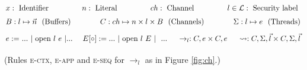 \documentclass[10pt,preprint]{sigplanconf}
\renewcommand{\t}[1]{~\text{#1}~}
\begin{document}



\begin{figure*}
\[ \arraycolsep=1.6pt\def\arraystretch{1.5}
\begin{array}{rl}
  \multicolumn{2}{l}{x : \t{Identifier} \hfill n : \t{Literal} \hfill ch : \t{Channel} \hfill l \in \mathcal{L} : \t{Security label}} \\
  \multicolumn{2}{l}{
    B : l \mapsto \vec{n} ~~(\text{Buffers})~~\hfill~~
    C : ch \mapsto n \times l \times B~~(\text{Channels})~~\hfill~~
    \Sigma : l \mapsto e ~~(\text{Threads})} \\[1ex]
  e := & ... ~| \t{open} l~e ~| ...~~\hfill~~
    E[\circ] := ...~| \t{open} l~E~| ~~...~~\hfill~~\rightarrow_l : C,e \times C,e ~~\hfill~~ \leadsto : C, \Sigma, \vec{l} \times C, \Sigma, \vec{l}
  \end{array} \\
\]

\begin{center}
  (Rules \textsc{e-ctx}, \textsc{e-app} and \textsc{e-seq} for $\rightarrow_l$ as in Figure \ref{fig:ch}.) \\[1em]


\end{center}
\end{figure*}
\end{document}
